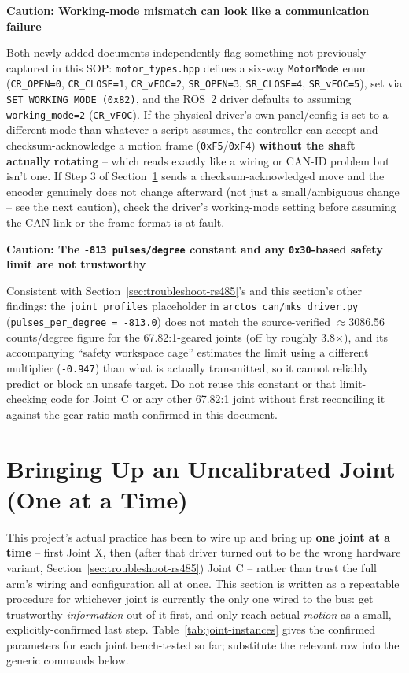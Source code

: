 \documentclass[11pt,letterpaper]{article}
\newenvironment{caution}[1]{%
    \par\addvspace{8pt}%
    \noindent{\color{cautionred}\rule{\linewidth}{0.8pt}}\par\vspace{2pt}
    \noindent\textbf{\color{cautionred}Caution: #1}\par\vspace{2pt}
}{%
    \par\vspace{2pt}\noindent{\color{cautionred}\rule{\linewidth}{0.4pt}}%
    \par\addvspace{8pt}%
}
\begin{document}
\begin{caution}{Working-mode mismatch can look like a communication failure}
Both newly-added documents independently flag something not previously captured in this SOP: \texttt{motor\_types.hpp} defines a six-way \texttt{MotorMode} enum (\texttt{CR\_OPEN=0}, \texttt{CR\_CLOSE=1}, \texttt{CR\_vFOC=2}, \texttt{SR\_OPEN=3}, \texttt{SR\_CLOSE=4}, \texttt{SR\_vFOC=5}), set via \texttt{SET\_WORKING\_MODE (0x82)}, and the ROS~2 driver defaults to assuming \texttt{working\_mode=2} (\texttt{CR\_vFOC}). If the physical driver's own panel/config is set to a different mode than whatever a script assumes, the controller can accept and checksum-acknowledge a motion frame (\texttt{0xF5}/\texttt{0xF4}) \textbf{without the shaft actually rotating} -- which reads exactly like a wiring or CAN-ID problem but isn't one. If Step 3 of Section~\ref{sec:joint-bringup} sends a checksum-acknowledged move and the encoder genuinely does not change afterward (not just a small/ambiguous change -- see the next caution), check the driver's working-mode setting before assuming the CAN link or the frame format is at fault.
\end{caution}

\begin{caution}{The \texttt{-813 pulses/degree} constant and any \texttt{0x30}-based safety limit are not trustworthy}
Consistent with Section~\ref{sec:troubleshoot-rs485}'s and this section's other findings: the \texttt{joint\_profiles} placeholder in \texttt{arctos\_can/mks\_driver.py} (\texttt{pulses\_per\_degree = -813.0}) does not match the source-verified $\approx$3086.56 counts/degree figure for the 67.82:1-geared joints (off by roughly 3.8$\times$), and its accompanying ``safety workspace cage'' estimates the limit using a different multiplier (\texttt{-0.947}) than what is actually transmitted, so it cannot reliably predict or block an unsafe target. Do not reuse this constant or that limit-checking code for Joint C or any other 67.82:1 joint without first reconciling it against the gear-ratio math confirmed in this document.
\end{caution}

\section{Bringing Up an Uncalibrated Joint (One at a Time)}
\label{sec:joint-bringup}
This project's actual practice has been to wire up and bring up \textbf{one joint at a time} -- first Joint X, then (after that driver turned out to be the wrong hardware variant, Section~\ref{sec:troubleshoot-rs485}) Joint C -- rather than trust the full arm's wiring and configuration all at once. This section is written as a repeatable procedure for whichever joint is currently the only one wired to the bus: get trustworthy \emph{information} out of it first, and only reach actual \emph{motion} as a small, explicitly-confirmed last step. Table~\ref{tab:joint-instances} gives the confirmed parameters for each joint bench-tested so far; substitute the relevant row into the generic commands below.
\end{document}
